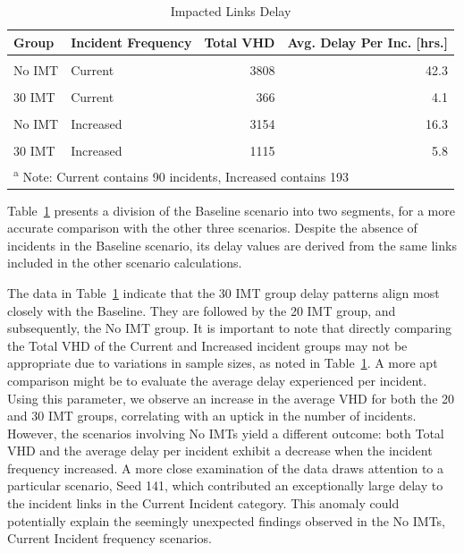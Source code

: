 \documentclass[fancy, oneside, mastersfancy, ms]{byuthesis}
\begin{document}
\hypertarget{tbl-impacted-links}{}
\begin{table}
\caption{\label{tbl-impacted-links}Impacted Links Delay }\tabularnewline

\centering
\begin{tabular}[t]{llrr}
\toprule
\textbf{Group} & \textbf{Incident Frequency} & \textbf{Total VHD} & \textbf{Avg. Delay Per Inc. [hrs.]}\\
\midrule
\cellcolor{gray!6}{Baseline} & \cellcolor{gray!6}{Current} & \cellcolor{gray!6}{326} & \cellcolor{gray!6}{3.6}\\
No IMT & Current & 3808 & 42.3\\
\cellcolor{gray!6}{20 IMT} & \cellcolor{gray!6}{Current} & \cellcolor{gray!6}{723} & \cellcolor{gray!6}{8.0}\\
30 IMT & Current & 366 & 4.1\\
\cellcolor{gray!6}{Baseline} & \cellcolor{gray!6}{Increased} & \cellcolor{gray!6}{540} & \cellcolor{gray!6}{2.8}\\
\addlinespace
No IMT & Increased & 3154 & 16.3\\
\cellcolor{gray!6}{20 IMT} & \cellcolor{gray!6}{Increased} & \cellcolor{gray!6}{1645} & \cellcolor{gray!6}{8.5}\\
30 IMT & Increased & 1115 & 5.8\\
\bottomrule
\multicolumn{4}{l}{\textsuperscript{a} Note: Current contains 90 incidents, Increased contains 193}\\
\end{tabular}
\end{table}

Table~\ref{tbl-impacted-links} presents a division of the Baseline
scenario into two segments, for a more accurate comparison with the
other three scenarios. Despite the absence of incidents in the Baseline
scenario, its delay values are derived from the same links included in
the other scenario calculations.

The data in Table~\ref{tbl-impacted-links} indicate that the 30 IMT
group delay patterns align most closely with the Baseline. They are
followed by the 20 IMT group, and subsequently, the No IMT group. It is
important to note that directly comparing the Total VHD of the Current
and Increased incident groups may not be appropriate due to variations
in sample sizes, as noted in Table~\ref{tbl-impacted-links}. A more apt
comparison might be to evaluate the average delay experienced per
incident. Using this parameter, we observe an increase in the average
VHD for both the 20 and 30 IMT groups, correlating with an uptick in the
number of incidents. However, the scenarios involving No IMTs yield a
different outcome: both Total VHD and the average delay per incident
exhibit a decrease when the incident frequency increased. A more close
examination of the data draws attention to a particular scenario, Seed
141, which contributed an exceptionally large delay to the incident
links in the Current Incident category. This anomaly could potentially
explain the seemingly unexpected findings observed in the No IMTs,
Current Incident frequency scenarios.
\end{document}
